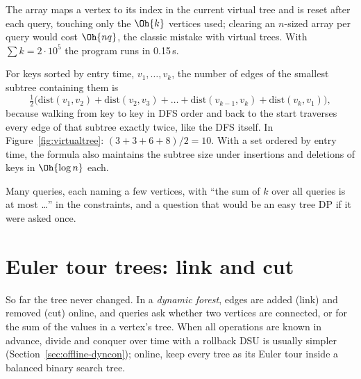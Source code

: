 
The array  maps a vertex to its index in the current virtual tree and is reset after each query, touching only the
$\Oh{k}$ vertices used; clearing an $n$-sized array per query would cost $\Oh{nq}$, the classic mistake with virtual trees. With
$\sum k = 2 \cdot 10^5$ the program runs in 0.15\,s.

\begin{trick}
For keys sorted by entry time, $v_1, \dots, v_k$, the number of edges of the smallest subtree containing them is
\[
  \tfrac12 \bigl(\mathrm{dist}(v_1, v_2) + \mathrm{dist}(v_2, v_3) + \dots + \mathrm{dist}(v_{k-1}, v_k) + \mathrm{dist}(v_k,
  v_1)\bigr),
\]
because walking from key to key in DFS order and back to the start traverses every edge of that subtree exactly twice, like the
DFS itself. In Figure~\ref{fig:virtualtree}: $(3 + 3 + 6 + 8)/2 = 10$. With a set ordered by entry time, the formula also maintains
the subtree size under insertions and deletions of keys in $\Oh{\log n}$ each.
\end{trick}

\begin{recognize}
Many queries, each naming a few vertices, with ``the sum of $k$ over all queries is at most \dots'' in the constraints, and a
question that would be an easy tree DP if it were asked once.
\end{recognize}

\section[Euler tour trees]{Euler tour trees: link and cut \hfill \ioi}\label{sec:ett}

So far the tree never changed. In a \emph{dynamic forest}, edges are added (link) and removed (cut) online, and queries ask
whether two vertices are connected, or for the sum of the values in a vertex's tree. When all operations are known in advance,
divide and conquer over time with a rollback DSU is usually simpler (Section~\ref{sec:offline-dyncon}); online, keep every tree as
its Euler tour inside a balanced binary search tree.


